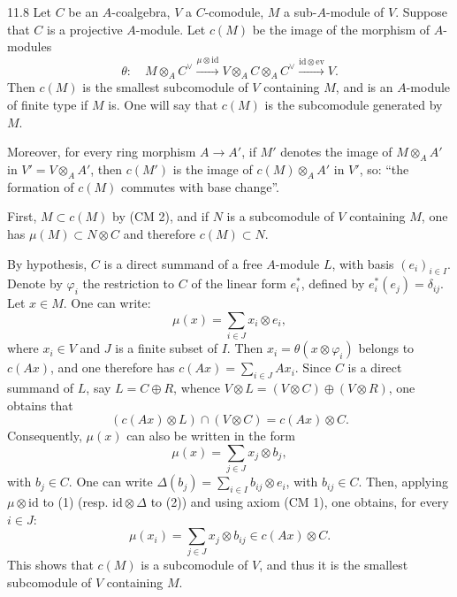 \begin{lemma}{11.8}\label{VIB.11.8}
Let $C$ be an $A$-coalgebra, $V$ a $C$-comodule, $M$ a sub-$A$-module of $V$. Suppose that $C$ is a projective $A$-module. Let $c(M)$ be the image of the morphism of $A$-modules
\[
\theta:\quad M\otimes_A C^\vee\xrightarrow{\mu\otimes\mathrm{id}}V\otimes_A C\otimes_A C^\vee\xrightarrow{\mathrm{id}\otimes\mathrm{ev}}V.
\]
Then $c(M)$ is the smallest subcomodule of $V$ containing $M$, and is an $A$-module of finite type if $M$ is. One will say that $c(M)$ is the subcomodule generated by $M$.

Moreover, for every ring morphism $A\to A'$, if $M'$ denotes the image of $M\otimes_A A'$ in $V'=V\otimes_A A'$, then $c(M')$ is the image of $c(M)\otimes_A A'$ in $V'$, so: ``the formation of $c(M)$ commutes with base change''.
\end{lemma}
First, $M\subset c(M)$ by (CM 2), and if $N$ is a subcomodule of $V$ containing $M$, one has $\mu(M)\subset N\otimes C$ and therefore $c(M)\subset N$.

By hypothesis, $C$ is a direct summand of a free $A$-module $L$, with basis $(e_i)_{i\in I}$. Denote by $\varphi_i$ the restriction to $C$ of the linear form $e_i^*$, defined by $e_i^*(e_j)=\delta_{ij}$. Let $x\in M$. One can write:
\begin{equation*}\tag{1}
\mu(x)=\sum_{i\in J}x_i\otimes e_i,
\end{equation*}
where $x_i\in V$ and $J$ is a finite subset of $I$. Then $x_i=\theta(x\otimes\varphi_i)$ belongs to $c(Ax)$, and one therefore has $c(Ax)=\sum_{i\in J}Ax_i$. Since $C$ is a direct summand of $L$, say $L=C\oplus R$, whence $V\otimes L=(V\otimes C)\oplus(V\otimes R)$, one obtains that
\[
(c(Ax)\otimes L)\cap(V\otimes C)=c(Ax)\otimes C.
\]
Consequently, $\mu(x)$ can also be written in the form
\begin{equation*}\tag{2}
\mu(x)=\sum_{j\in J}x_j\otimes b_j,
\end{equation*}
with $b_j\in C$. One can write $\Delta(b_j)=\sum_{i\in I}b_{ij}\otimes e_i$, with $b_{ij}\in C$. Then, applying $\mu\otimes\mathrm{id}$ to (1) (resp. $\mathrm{id}\otimes\Delta$ to (2)) and using axiom (CM 1), one obtains, for every $i\in J$:
\[
\mu(x_i)=\sum_{j\in J}x_j\otimes b_{ij}\in c(Ax)\otimes C.
\]
This shows that $c(M)$ is a subcomodule of $V$, and thus it is the smallest subcomodule of $V$ containing $M$.

